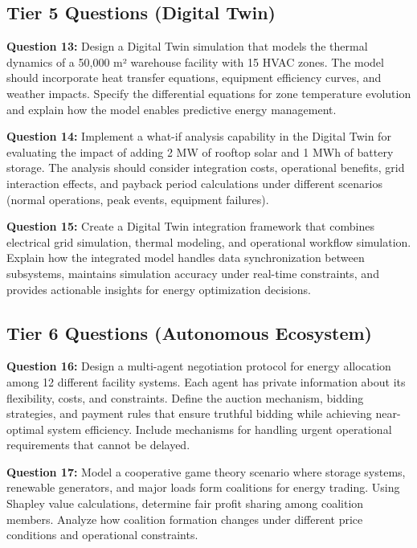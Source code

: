 \documentclass{article}
\begin{document}
\subsection{Tier 5 Questions (Digital Twin)}

\textbf{Question 13:} Design a Digital Twin simulation that models the thermal dynamics of a 50,000 m² warehouse facility with 15 HVAC zones. The model should incorporate heat transfer equations, equipment efficiency curves, and weather impacts. Specify the differential equations for zone temperature evolution and explain how the model enables predictive energy management.

\textbf{Question 14:} Implement a what-if analysis capability in the Digital Twin for evaluating the impact of adding 2 MW of rooftop solar and 1 MWh of battery storage. The analysis should consider integration costs, operational benefits, grid interaction effects, and payback period calculations under different scenarios (normal operations, peak events, equipment failures).

\textbf{Question 15:} Create a Digital Twin integration framework that combines electrical grid simulation, thermal modeling, and operational workflow simulation. Explain how the integrated model handles data synchronization between subsystems, maintains simulation accuracy under real-time constraints, and provides actionable insights for energy optimization decisions.

\subsection{Tier 6 Questions (Autonomous Ecosystem)}

\textbf{Question 16:} Design a multi-agent negotiation protocol for energy allocation among 12 different facility systems. Each agent has private information about its flexibility, costs, and constraints. Define the auction mechanism, bidding strategies, and payment rules that ensure truthful bidding while achieving near-optimal system efficiency. Include mechanisms for handling urgent operational requirements that cannot be delayed.

\textbf{Question 17:} Model a cooperative game theory scenario where storage systems, renewable generators, and major loads form coalitions for energy trading. Using Shapley value calculations, determine fair profit sharing among coalition members. Analyze how coalition formation changes under different price conditions and operational constraints.
\end{document}
